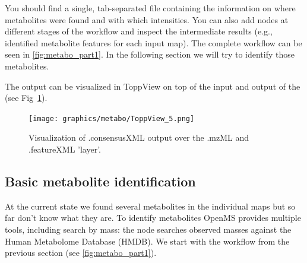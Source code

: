You should find a single, tab-separated file containing the information on where metabolites were found and with which intensities.
You can also add  nodes at different stages of the workflow and inspect the intermediate results (e.g., identified metabolite features for each input map).
The complete workflow can be seen in \cref{fig:metabo_part1}.
In the following section we will try to identify those metabolites.

\noindent The  output can be visualized in ToppView on top of the input and output of the  (see Fig~\ref{fig:ToppView_5}). 

\begin{figure}[htbp]
  \centering
  \texttt{[image: graphics/metabo/ToppView\_5.png]}
  \caption{Visualization of .consensusXML output over the .mzML and .featureXML 'layer'. }
  \label{fig:ToppView_5}
\end{figure}

\subsection{Basic metabolite identification}

At the current state we found several metabolites in the individual maps but so far don't know what they are.
To identify metabolites OpenMS provides multiple tools, including search by mass: the  node searches observed masses against the Human Metabolome Database (HMDB)\cite{Wishart2007,Wishart2009,Wishart2013}.
We start with the workflow from the previous section (see \cref{fig:metabo_part1}).


